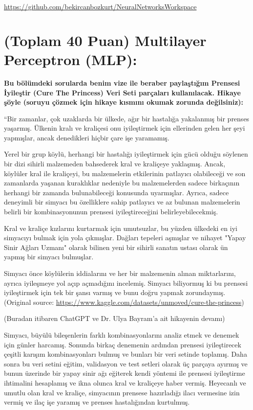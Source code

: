 \documentclass[11pt]{article}
\begin{document}
\url{https://github.com/bekircanbozkurt/NeuralNetworksWorkspace}

\section{(Toplam 40 Puan) Multilayer Perceptron (MLP):} 
\textbf{Bu bölümdeki sorularda benim vize ile beraber paylaştığım Prensesi İyileştir (Cure The Princess) Veri Seti parçaları kullanılacak. Hikaye şöyle (soruyu çözmek için hikaye kısmını okumak zorunda değilsiniz):} 

``Bir zamanlar, çok uzaklarda bir ülkede, ağır bir hastalığa yakalanmış bir prenses yaşarmış. Ülkenin kralı ve kraliçesi onu iyileştirmek için ellerinden gelen her şeyi yapmışlar, ancak denedikleri hiçbir çare işe yaramamış.

Yerel bir grup köylü, herhangi bir hastalığı iyileştirmek için gücü olduğu söylenen bir dizi sihirli malzemeden bahsederek kral ve kraliçeye yaklaşmış. Ancak, köylüler kral ile kraliçeyi, bu malzemelerin etkilerinin patlayıcı olabileceği ve son zamanlarda yaşanan kuraklıklar nedeniyle bu malzemelerden sadece birkaçının herhangi bir zamanda bulunabileceği konusunda uyarmışlar. Ayrıca, sadece deneyimli bir simyacı bu özelliklere sahip patlayıcı ve az bulunan malzemelerin belirli bir kombinasyonunun prensesi iyileştireceğini belirleyebilecekmiş.

Kral ve kraliçe kızlarını kurtarmak için umutsuzlar, bu yüzden ülkedeki en iyi simyacıyı bulmak için yola çıkmışlar. Dağları tepeleri aşmışlar ve nihayet "Yapay Sinir Ağları Uzmanı" olarak bilinen yeni bir sihirli sanatın ustası olarak ün yapmış bir simyacı bulmuşlar.

Simyacı önce köylülerin iddialarını ve her bir malzemenin alınan miktarlarını, ayrıca iyileşmeye yol açıp açmadığını incelemiş. Simyacı biliyormuş ki bu prensesi iyileştirmek için tek bir şansı varmış ve bunu doğru yapmak zorundaymış. (Original source: \url{https://www.kaggle.com/datasets/unmoved/cure-the-princess})

(Buradan itibaren ChatGPT ve Dr. Ulya Bayram'a ait hikayenin devamı)

Simyacı, büyülü bileşenlerin farklı kombinasyonlarını analiz etmek ve denemek için günler harcamış. Sonunda birkaç denemenin ardından prensesi iyileştirecek çeşitli karışım kombinasyonları bulmuş ve bunları bir veri setinde toplamış. Daha sonra bu veri setini eğitim, validasyon ve test setleri olarak üç parçaya ayırmış ve bunun üzerinde bir yapay sinir ağı eğiterek kendi yöntemi ile prensesi iyileştirme ihtimalini hesaplamış ve ikna olunca kral ve kraliçeye haber vermiş. Heyecanlı ve umutlu olan kral ve kraliçe, simyacının prensese hazırladığı ilacı vermesine izin vermiş ve ilaç işe yaramış ve prenses hastalığından kurtulmuş.
\end{document}
